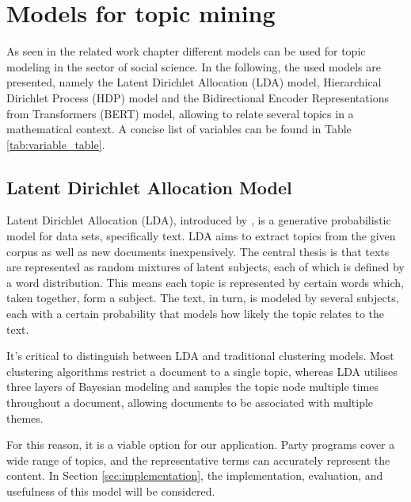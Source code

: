 \section{Models for topic mining}\label{sec:models}
As seen in the related work chapter different models can be used for topic modeling in the sector of social science. In the following, the used models are presented, namely the Latent Dirichlet Allocation (LDA) model, Hierarchical Dirichlet Process (HDP) model and the Bidirectional Encoder Representations from Transformers (BERT) model, allowing to relate several topics in a mathematical context. A concise list of variables can be found in Table \ref{tab:variable_table}.

\subsection{Latent Dirichlet Allocation Model}
Latent Dirichlet Allocation (LDA), introduced by \citet{blei2003latent}, is a generative probabilistic model for data sets, specifically text. LDA aims to extract topics from the given corpus as well as new documents inexpensively.
The central thesis is that texts are represented as random mixtures of latent subjects, each of which is defined by a word distribution. This means each topic is represented by certain words which, taken together, form a subject. The text, in turn, is modeled by several subjects, each with a certain probability that models how likely the topic relates to the text.

It's critical to distinguish between LDA and traditional clustering models.
Most clustering algorithms restrict a document to a single topic, whereas LDA utilises three layers of Bayesian modeling and samples the topic node multiple times throughout a document, allowing documents to be associated with multiple themes. 

For this reason, it is a viable option for our application.
Party programs cover a wide range of topics, and the representative terms can accurately represent the content.
In Section \ref{sec:implementation}, the implementation, evaluation, and usefulness of this model will be considered. 

